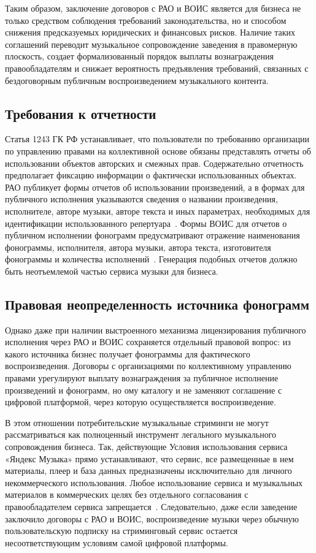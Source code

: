 Таким образом, заключение договоров с РАО и ВОИС является для бизнеса не только средством соблюдения требований законодательства, но и способом снижения предсказуемых юридических и финансовых рисков. Наличие таких соглашений переводит музыкальное сопровождение заведения в правомерную плоскость, создает формализованный порядок выплаты вознаграждения правообладателям и снижает вероятность предъявления требований, связанных с бездоговорным публичным воспроизведением музыкального контента.

\subsection{Требования к отчетности}

Статья 1243 ГК РФ устанавливает, что пользователи по требованию организации по управлению правами на коллективной основе обязаны представлять отчеты об использовании объектов авторских и смежных прав. Содержательно отчетность предполагает фиксацию информации о фактически использованных объектах. РАО публикует формы отчетов об использовании произведений, а в формах для публичного исполнения указываются сведения о названии произведения, исполнителе, авторе музыки, авторе текста и иных параметрах, необходимых для идентификации использованного репертуара~\cite{rao_report_forms}. Формы ВОИС для отчетов о публичном исполнении фонограмм предусматривают отражение наименования фонограммы, исполнителя, автора музыки, автора текста, изготовителя фонограммы и количества исполнений~\cite{vois_report_form}. Генерация подобных отчетов должно быть неотъемлемой частью сервиса музыки для бизнеса.

\subsection{Правовая неопределенность источника фонограмм}

Однако даже при наличии выстроенного механизма лицензирования публичного исполнения через РАО и ВОИС сохраняется отдельный правовой вопрос: из какого источника бизнес получает фонограммы для фактического воспроизведения. Договоры с организациями по коллективному управлению правами урегулируют выплату вознаграждения за публичное исполнение произведений и фонограмм, но ому каталогу и не заменяют соглашение с цифровой платформой, через которую осуществляется воспроизведение.

В этом отношении потребительские музыкальные стриминги не могут рассматриваться как полноценный инструмент легального музыкального сопровождения бизнеса. Так, действующие Условия использования сервиса «Яндекс Музыка» прямо устанавливают, что сервис, все размещенные в нем материалы, плеер и база данных предназначены исключительно для личного некоммерческого использования. Любое использование сервиса и музыкальных материалов в коммерческих целях без отдельного согласования с правообладателем сервиса запрещается~\cite{yandex_music_terms}. Следовательно, даже если заведение заключило договоры с РАО и ВОИС, воспроизведение музыки через обычную пользовательскую подписку на стриминговый сервис остается несоответствующим условиям самой цифровой платформы.

